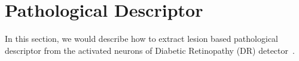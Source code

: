 \documentclass[letterpaper]{article} %
\begin{document}


\section{Pathological Descriptor}

In this section, we would describe how to extract lesion based pathological descriptor from the activated neurons of Diabetic Retinopathy (DR) detector~\cite{oO2016detector}.%





\end{document}
